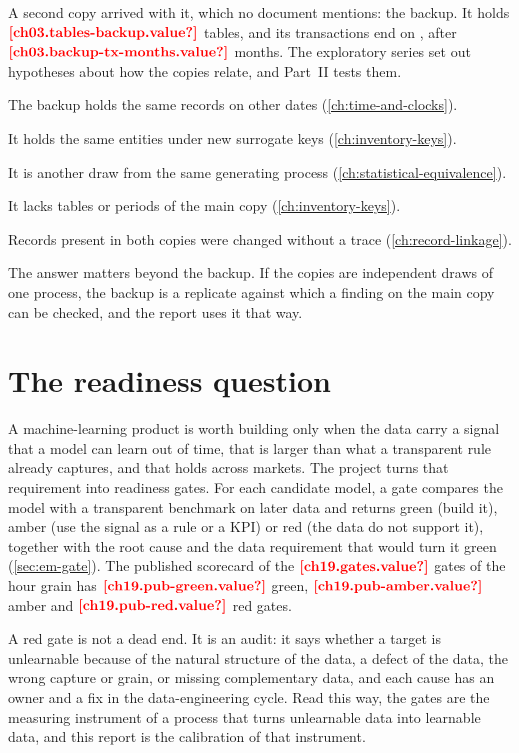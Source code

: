 A second copy arrived with it, which no document mentions: the backup. It holds $\est{ch03.tables-backup}{value}$
tables, and its transactions end on , after
$\est{ch03.backup-tx-months}{value}$ months. The exploratory series set out hypotheses about how the copies relate, and
Part~II tests them.
\begin{description}[style=nextline]
  \item[\ident{H1}, a shift in time] The backup holds the same records on other dates (\cref{ch:time-and-clocks}).
  \item[\ident{H2}, new keys] It holds the same entities under new surrogate keys (\cref{ch:inventory-keys}).
  \item[\ident{H3}, an independent replicate] It is another draw from the same generating process
  (\cref{ch:statistical-equivalence}).
  \item[\ident{H4}, an incomplete copy] It lacks tables or periods of the main copy (\cref{ch:inventory-keys}).
  \item[\ident{H5}, silent mutation] Records present in both copies were changed without a trace
  (\cref{ch:record-linkage}).
\end{description}
The answer matters beyond the backup. If the copies are independent draws of one process, the backup is a replicate
against which a finding on the main copy can be checked, and the report uses it that way.

\section{The readiness question}\label{sec:intro-question}

A machine-learning product is worth building only when the data carry a signal that a model can learn out of time,
that is larger than what a transparent rule already captures, and that holds across markets. The project turns that
requirement into readiness gates. For each candidate model, a gate compares the model with a transparent benchmark on
later data and returns green (build it), amber (use the signal as a rule or a KPI) or red (the data do not support
it), together with the root cause and the data requirement that would turn it green (\cref{sec:em-gate}). The
published scorecard of the $\est{ch19.gates}{value}$ gates of the hour grain has $\est{ch19.pub-green}{value}$ green,
$\est{ch19.pub-amber}{value}$ amber and $\est{ch19.pub-red}{value}$ red gates.

A red gate is not a dead end. It is an audit: it says whether a target is unlearnable because of the natural structure
of the data, a defect of the data, the wrong capture or grain, or missing complementary data, and each cause has an
owner and a fix in the data-engineering cycle. Read this way, the gates are the measuring instrument of a process that
turns unlearnable data into learnable data, and this report is the calibration of that instrument.

